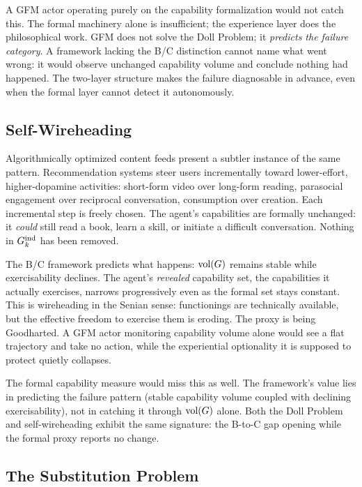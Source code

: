 A GFM actor operating purely on the capability formalization would not catch
this. The formal machinery alone is insufficient; the experience layer does the
philosophical work. GFM does not solve the Doll Problem; it \emph{predicts the
failure category}. A framework lacking the B/C distinction cannot name what
went wrong: it would observe unchanged capability volume and conclude nothing
had happened. The two-layer structure makes the failure diagnosable in advance,
even when the formal layer cannot detect it autonomously.

\subsection{Self-Wireheading}
\label{sec:self_wireheading}

Algorithmically optimized content feeds present a subtler instance of the same
pattern. Recommendation systems steer users incrementally toward lower-effort,
higher-dopamine activities: short-form video over long-form reading, parasocial
engagement over reciprocal conversation, consumption over creation. Each
incremental step is freely chosen. The agent's capabilities are formally
unchanged: it \emph{could} still read a book, learn a skill, or initiate a
difficult conversation. Nothing in $G_{k}^{\mathrm{ind}}$ has been removed.

The B/C framework predicts what happens: $\operatorname{vol}(G)$ remains stable while
exercisability declines. The agent's \emph{revealed} capability set, the
capabilities it actually exercises, narrows progressively even as the formal
set stays constant. This is wireheading in the Senian sense: functionings are
technically available, but the effective freedom to exercise them is eroding.
The proxy is being Goodharted. A GFM actor monitoring capability volume alone
would see a flat trajectory and take no action, while the experiential
optionality it is supposed to protect quietly collapses.

The formal capability measure would miss this as well. The framework's value
lies in predicting the failure pattern (stable capability volume coupled with
declining exercisability), not in catching it through $\operatorname{vol}(G)$ alone. Both the
Doll Problem and self-wireheading exhibit the same signature: the B-to-C gap
opening while the formal proxy reports no change.

\subsection{The Substitution Problem}
\label{sec:substitution_problem}

